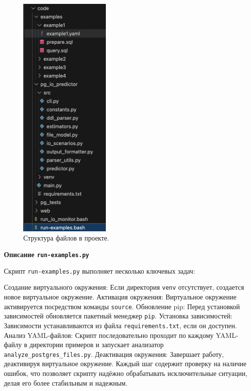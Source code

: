  
\begin{figure}[H]
    \centering
    \includegraphics[width=0.4\textwidth]{images/project-structure.png}
    \caption{Структура файлов в проекте.}
    \label{img:project-structure}
\end{figure}

\textbf{Описание \texttt{run-examples.py}}

Скрипт \texttt{run-examples.py} выполняет несколько ключевых задач:

Создание виртуального окружения: Если директория \texttt{venv} отсутствует, создается новое виртуальное окружение.
Активация окружения: Виртуальное окружение активируется посредством команды \texttt{source}.
Обновление pip: Перед установкой зависимостей обновляется пакетный менеджер \texttt{pip}.
Установка зависимостей: Зависимости устанавливаются из файла \texttt{requirements.txt}, если он доступен.
Анализ YAML-файлов: Скрипт последовательно проходит по каждому YAML-файлу в директории примеров и запускает анализатор \texttt{analyze\_postgres\_files.py}.
Деактивация окружения: Завершает работу, деактивируя виртуальное окружение.
Каждый шаг содержит проверку на наличие ошибок, что позволяет скрипту надёжно обрабатывать исключительные ситуации, делая его более стабильным и надежным.

